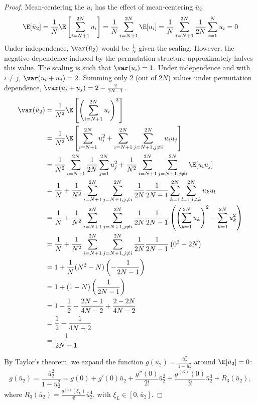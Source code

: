 \begin{proof}
  Mean-centering the $u_i$ has the effect of mean-centering $\bar{u}_2$:
  \begin{equation*}
    \E[\bar{u}_2] = 
    \frac{1}{N} \E \left [ \sum_{i=N+1}^{2N} u_i \right ] = 
    \frac{1}{N} \sum_{i=N+1}^{2N} \E[u_i] = 
    \frac{1}{N} \sum_{i=N+1}^{2N} \frac{1}{2N} \sum_{i=1}^N u_i = 0
  \end{equation*}
  Under independence, $\var(\bar{u}_2)$ would be $\frac{1}{N}$ given
  the scaling.  However, the negative dependence induced by the
  permutation structure approximately halves this value.
  The scaling is such that $\var(u_i) = 1$.  Under independence and
  with $i \neq j$, $\var(u_i + u_j) = 2$.  Summing only 2 (out of $2N$)
  values under permutation dependence, $\var(u_i + u_j) = 2 - \frac{2}{2N-1}$.
  \begin{align*}
    \var(\bar{u}_2) 
    &= \frac{1}{N^2} \E \left [\left (\sum_{i=N+1}^{2N}u_i\right
      )^2\right ] \\
    &= \frac{1}{N^2} \E \left [\sum_{i=N+1}^{2N} u_i^2 +
    \sum_{i=N+1}^{2N}\sum_{j=N+1, j\neq i}^{2N}u_iu_j \right ] \\
    &= \frac{1}{N^2} \sum_{i=N+1}^{2N} \frac{1}{2N} \sum_{j=1}^{2N} u_j^2
    + \frac{1}{N^2}\sum_{i=N+1}^{2N}\sum_{j=N+1, j\neq
      i}^{2N} \E[u_i u_j] \\
    &= \frac{1}{N} + \frac{1}{N^2}\sum_{i=N+1}^{2N}\sum_{j=N+1, j\neq
      i}^{2N} \frac{1}{2N}\frac{1}{2N-1}\sum_{k=1}^{2N}
    \sum_{l=1, l\neq k}^{2N} u_ku_l \\
    &= \frac{1}{N} + \frac{1}{N^2}\sum_{i=N+1}^{2N}\sum_{j=N+1, j\neq
      i}^{2N} \frac{1}{2N}\frac{1}{2N-1} \left (
    \left (\sum_{k=1}^{2N} u_k \right )^2 - \sum_{k=1}^{2N} u_k^2
  \right ) \\
    &= \frac{1}{N} + \frac{1}{N^2}\sum_{i=N+1}^{2N}\sum_{j=N+1, j\neq
      i}^{2N} \frac{1}{2N}\frac{1}{2N-1} \left (
    0^2 - 2N \right ) \\
    &= 1 + \frac{1}{N}(N^2-N)\left (-\frac{1}{2N-1}\right ) \\
    &= 1 + (1-N)\left (\frac{1}{2N-1}\right ) \\
    &= 1 - \frac{1}{2} + \frac{2N-1}{4N-2} + \frac{2-2N}{4N-2} \\
    &= \frac{1}{2} + \frac{1}{4N-2} \\
    &= \frac{1}{2N-1}
  \end{align*}

  By Taylor's theorem, we expand the function $g(\bar{u}_2) =
  \frac{\bar{u}_2^2}{1-\bar{u}_2^2}$ around $\E[\bar{u}_2] = 0$: 
  \begin{equation*}
    g(\bar{u}_2) = \frac{\bar{u}_2^2}{1-\bar{u}_2^2} = g(0) + g'(0)
    \bar{u}_2 + \frac{g''(0)}{2!}\bar{u}_2^2 +
    \frac{g^{(3)}(0)}{3!}\bar{u}_2^3 + R_3(\bar{u}_2),
  \end{equation*}
  where $R_3(\bar{u}_2) = \frac{g^{(4)}(\xi_L)}{4!}\bar{u}_2^4$, with
  $\xi_L \in [0, \bar{u}_2]$.


\end{proof}
